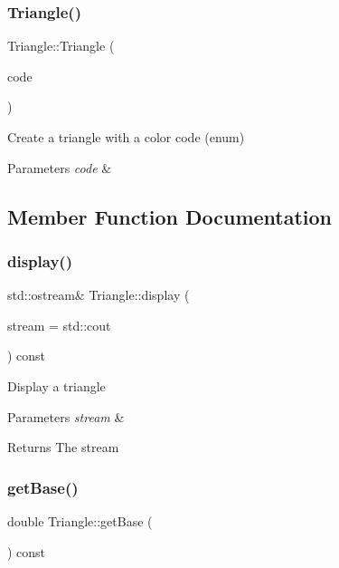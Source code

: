 \subsubsection{\texorpdfstring{Triangle()}{Triangle()}\hspace{0.1cm}{\footnotesize\ttfamily [3/3]}}
{\footnotesize\ttfamily Triangle\+::\+Triangle (\begin{DoxyParamCaption}\item[{\hyperlink{classColor_a20a7b04657c1d83fae5d54514d3f1622}{Color\+::\+Code}}]{code }\end{DoxyParamCaption})}

Create a triangle with a color code (enum) 
\begin{DoxyParams}{Parameters}
{\em code} & \\
\hline
\end{DoxyParams}


\subsection{Member Function Documentation}
\mbox{\label{classTriangle_aaa77891af77edc39ac1809fbbfee0fd4}} 
\subsubsection{\texorpdfstring{display()}{display()}}
{\footnotesize\ttfamily std\+::ostream\& Triangle\+::display (\begin{DoxyParamCaption}\item[{std\+::ostream \&}]{stream = {\ttfamily std\+:\+:cout} }\end{DoxyParamCaption}) const}

Display a triangle 
\begin{DoxyParams}{Parameters}
{\em stream} & \\
\hline
\end{DoxyParams}
\begin{DoxyReturn}{Returns}
The stream 
\end{DoxyReturn}
\mbox{\label{classTriangle_aae4fecc31aac51c2db24b56e2e061b8c}} 
\subsubsection{\texorpdfstring{get\+Base()}{getBase()}}
{\footnotesize\ttfamily double Triangle\+::get\+Base (\begin{DoxyParamCaption}{ }\end{DoxyParamCaption}) const}

